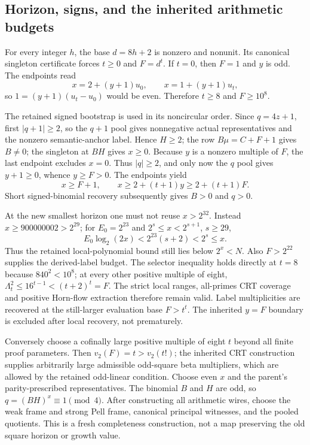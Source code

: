 \subsection*{Horizon, signs, and the inherited arithmetic budgets}
For every integer $h$, the base $d=8h+2$ is nonzero and nonunit.  Its canonical
singleton certificate forces $t\ge0$ and $F=d^t$.  If $t=0$, then $F=1$ and $y$
is odd.  The endpoints read
\[
 x=2+(y+1)u_0,\qquad x=1+(y+1)u_t,
\]
so $1=(y+1)(u_t-u_0)$ would be even.  Therefore $t\ge8$ and $F\ge10^8$.

The retained signed bootstrap is used in its noncircular order.
Since $q=4z+1$, first $|q+1|\ge2$, so the $q+1$ pool gives nonnegative actual
representatives and the nonzero semantic-anchor label.  Hence $H\ge2$;
the row $B\mu=C+F+1$ gives $B\ne0$; the singleton at $BH$ gives $x\ge0$.
Because $y$ is a nonzero multiple of $F$, the last endpoint excludes $x=0$.
Thus $|q|\ge2$, and only now the $q$ pool gives $y+1\ge0$, whence $y\ge F>0$.
The endpoints yield
\[
 x\ge F+1,\qquad x\ge2+(t+1)y\ge2+(t+1)F.
\]
Short signed-binomial recovery subsequently gives $B>0$ and $q>0$.

At the new smallest horizon one must not reuse $x>2^{32}$.
Instead $x\ge900000002>2^{29}$; for $E_0=2^{23}$ and
$2^s\le x<2^{s+1}$, $s\ge29$,
\[
 E_0\log_2(2x)<2^{23}(s+2)<2^s\le x.
\]
Thus the retained local-polynomial bound still lies below $2^x<N$.
Also $F>2^{22}$ supplies the derived-label budget.
The selector inequality holds directly at $t=8$ because
$840^2<10^8$; at every other positive multiple of eight,
$\Lambda_t^2\le16^{t-1}<(t+2)^t=F$.
The strict local ranges, all-primes CRT coverage and positive Horn-flow
extraction therefore remain valid.  Label multiplicities are recovered at
the still-larger evaluation base $F>t^t$.  The inherited $y=F$ boundary is
excluded after local recovery, not prematurely.

Conversely choose a cofinally large positive multiple of eight $t$ beyond
all finite proof parameters.  Then $v_2(F)=t>v_2(t!)$; the inherited CRT
construction supplies arbitrarily large admissible odd-square beta
multipliers, which are allowed by the retained odd-linear condition.
Choose even $x$ and the parent's parity-prescribed representatives.  The
binomial $B$ and $H$ are odd, so $q=(BH)^x\equiv1\pmod4$.
After constructing all arithmetic wires, choose the weak frame and strong
Pell frame, canonical principal witnesses, and the pooled quotients.
This is a fresh completeness construction, not a map preserving the old
square horizon or growth value.

